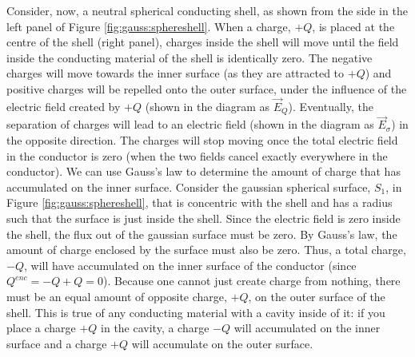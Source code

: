 Consider, now, a neutral spherical conducting shell, as shown from the side in the left panel of Figure \ref{fig:gauss:sphereshell}. When a charge, $+Q$, is placed at the centre of the shell (right panel), charges inside the shell will move until the field inside the conducting material of the shell is identically zero. The negative charges will move towards the inner surface (as they are attracted to $+Q$) and positive charges will be repelled onto the outer surface, under the influence of the electric field created by $+Q$ (shown in the diagram as $\vec E_{Q}$). Eventually, the separation of charges will lead to an electric field (shown in the diagram as $\vec E_{\sigma}$) in the opposite direction. The charges will stop moving once the total electric field in the conductor is zero (when the two fields cancel exactly everywhere in the conductor).
We can use Gauss's law to determine the amount of charge that has accumulated on the inner surface. Consider the gaussian spherical surface, $S_1$, in Figure \ref{fig:gauss:sphereshell}, that is concentric with the shell and has a radius such that the surface is just inside the shell. Since the electric field is zero inside the shell, the flux out of the gaussian surface must be zero. By Gauss's law, the amount of charge enclosed by the surface must also be zero. Thus, a total charge, $-Q$, will have accumulated on the inner surface of the conductor (since $Q^{enc}=-Q+Q=0$). Because one cannot just create charge from nothing, there must be an equal amount of opposite charge, $+Q$, on the outer surface of the shell. This is true of any conducting material with a cavity inside of it: if you place a charge $+Q$ in the cavity, a charge $-Q$ will accumulated on the inner surface and a charge $+Q$ will accumulate on the outer surface.

